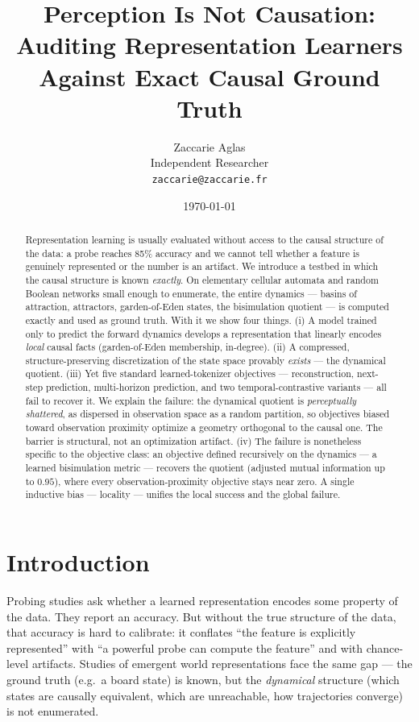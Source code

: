 \documentclass[11pt]{article}
\title{Perception Is Not Causation:\\
Auditing Representation Learners Against Exact Causal Ground Truth}
\author{Zaccarie Aglas\\ Independent Researcher\\ \texttt{zaccarie@zaccarie.fr}}
\date{\today}
\begin{document}
\maketitle

\begin{abstract}
Representation learning is usually evaluated without access to the causal
structure of the data: a probe reaches 85\% accuracy and we cannot tell
whether a feature is genuinely represented or the number is an artifact. We
introduce a testbed in which the causal structure is known \emph{exactly}. On
elementary cellular automata and random Boolean networks small enough to
enumerate, the entire dynamics --- basins of attraction, attractors,
garden-of-Eden states, the bisimulation quotient --- is computed exactly and
used as ground truth. With it we show four things. (i) A model trained only
to predict the forward dynamics develops a representation that linearly
encodes \emph{local} causal facts (garden-of-Eden membership, in-degree).
(ii) A compressed, structure-preserving discretization of the state space
provably \emph{exists} --- the dynamical quotient. (iii) Yet five standard
learned-tokenizer objectives --- reconstruction, next-step prediction,
multi-horizon prediction, and two temporal-contrastive variants --- all fail
to recover it. We explain the failure: the dynamical quotient is
\emph{perceptually shattered}, as dispersed in observation space as a random
partition, so objectives biased toward observation proximity optimize a
geometry orthogonal to the causal one. The barrier is structural, not an
optimization artifact. (iv) The failure is nonetheless specific to the
objective class: an objective defined recursively on the dynamics --- a
learned bisimulation metric --- recovers the quotient (adjusted mutual
information up to $0.95$), where every observation-proximity objective stays
near zero. A single inductive bias --- locality --- unifies the local success
and the global failure.
\end{abstract}

\section{Introduction}

Probing studies ask whether a learned representation encodes some property of
the data. They report an accuracy. But without the true structure of the
data, that accuracy is hard to calibrate: it conflates ``the feature is
explicitly represented'' with ``a powerful probe can compute the feature'' and
with chance-level artifacts. Studies of emergent world representations face
the same gap --- the ground truth (e.g.\ a board state) is known, but the
\emph{dynamical} structure (which states are causally equivalent, which are
unreachable, how trajectories converge) is not enumerated.
\end{document}
